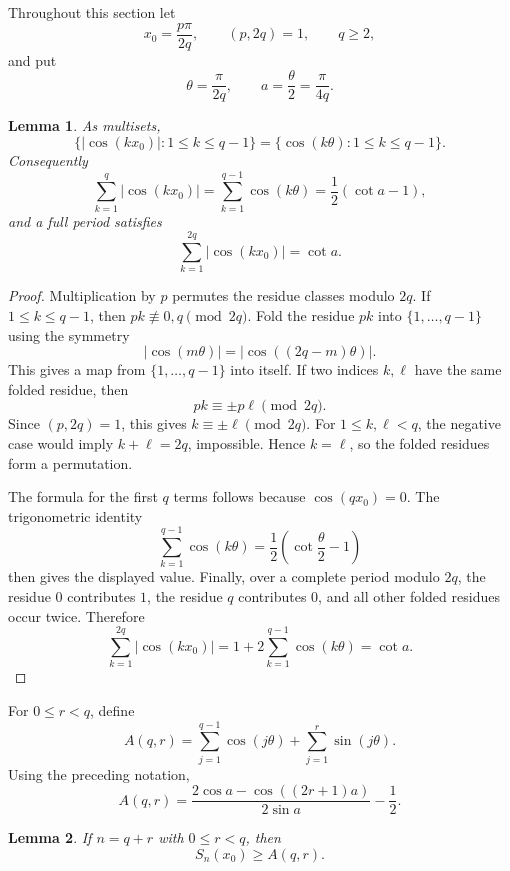 \documentclass[11pt]{article}
\newtheorem{lemma}{Lemma}
\begin{document}
Throughout this section let
\[
        x_0=\frac{p\pi}{2q},\qquad (p,2q)=1,\qquad q\ge2,
\]
and put
\[
        \theta=\frac{\pi}{2q},
        \qquad
        a=\frac{\theta}{2}=\frac{\pi}{4q}.
\]

\begin{lemma}\label{lem:permutation}
As multisets,
\[
        \bigl\{|\cos(kx_0)|:1\le k\le q-1\bigr\}
        =
        \bigl\{\cos(k\theta):1\le k\le q-1\bigr\}.
\]
Consequently
\[
        \sum_{k=1}^{q}|\cos(kx_0)|
        =
        \sum_{k=1}^{q-1}\cos(k\theta)
        =
        \frac12\left(\cot a-1\right),
\]
and a full period satisfies
\[
        \sum_{k=1}^{2q}|\cos(kx_0)|=\cot a.
\]
\end{lemma}

\begin{proof}
Multiplication by \(p\) permutes the residue classes modulo \(2q\). If \(1\le k\le q-1\), then \(pk\not\equiv 0,q\pmod{2q}\). Fold the residue \(pk\) into \(\{1,\dots,q-1\}\) using the symmetry
\[
        |\cos(m\theta)|=|\cos((2q-m)\theta)|.
\]
This gives a map from \(\{1,\dots,q-1\}\) into itself. If two indices \(k,\ell\) have the same folded residue, then
\[
        pk\equiv \pm p\ell \pmod{2q}.
\]
Since \((p,2q)=1\), this gives \(k\equiv\pm \ell\pmod{2q}\). For \(1\le k,\ell<q\), the negative case would imply \(k+\ell=2q\), impossible. Hence \(k=\ell\), so the folded residues form a permutation.

The formula for the first \(q\) terms follows because \(\cos(qx_0)=0\). The trigonometric identity
\[
        \sum_{k=1}^{q-1}\cos(k\theta)
        =\frac12\left(\cot\frac{\theta}{2}-1\right)
\]
then gives the displayed value. Finally, over a complete period modulo \(2q\), the residue \(0\) contributes \(1\), the residue \(q\) contributes \(0\), and all other folded residues occur twice. Therefore
\[
        \sum_{k=1}^{2q}|\cos(kx_0)|
        =
        1+2\sum_{k=1}^{q-1}\cos(k\theta)
        =\cot a.
\]
\end{proof}

For \(0\le r<q\), define
\[
        A(q,r)
        =
        \sum_{j=1}^{q-1}\cos(j\theta)
        +
        \sum_{j=1}^{r}\sin(j\theta).
\]
Using the preceding notation,
\[
        A(q,r)
        =
        \frac{2\cos a-\cos((2r+1)a)}{2\sin a}
        -\frac12.
        \tag{1}\label{eq:Aformula}
\]

\begin{lemma}\label{lem:short-lower}
If \(n=q+r\) with \(0\le r<q\), then
\[
        S_n(x_0)\ge A(q,r).
\]
\end{lemma}
\end{document}
